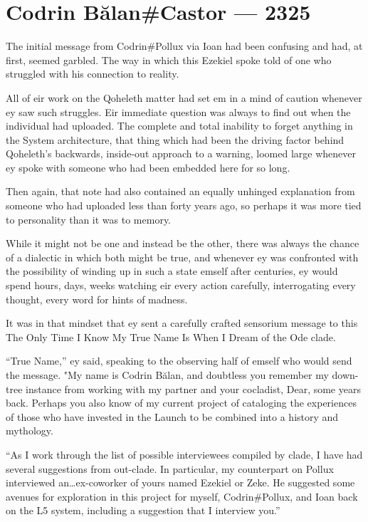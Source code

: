 \hypertarget{codrin-bux103lancastor-2325}{%
\chapter{Codrin Bălan\#Castor — 2325}\label{codrin-bux103lancastor-2325}}

The initial message from Codrin\#Pollux via Ioan had been confusing and had, at first, seemed garbled. The way in which this Ezekiel spoke told of one who struggled with his connection to reality.

All of eir work on the Qoheleth matter had set em in a mind of caution whenever ey saw such struggles. Eir immediate question was always to find out when the individual had uploaded. The complete and total inability to forget anything in the System architecture, that thing which had been the driving factor behind Qoheleth's backwards, inside-out approach to a warning, loomed large whenever ey spoke with someone who had been embedded here for so long.

Then again, that note had also contained an equally unhinged explanation from someone who had uploaded less than forty years ago, so perhaps it was more tied to personality than it was to memory.

While it might not be one and instead be the other, there was always the chance of a dialectic in which both might be true, and whenever ey was confronted with the possibility of winding up in such a state emself after centuries, ey would spend hours, days, weeks watching eir every action carefully, interrogating every thought, every word for hints of madness.

It was in that mindset that ey sent a carefully crafted sensorium message to this The Only Time I Know My True Name Is When I Dream of the Ode clade.

``True Name,'' ey said, speaking to the observing half of emself who would send the message. "My name is Codrin Bălan, and doubtless you remember my down-tree instance from working with my partner and your cocladist, Dear, some years back. Perhaps you also know of my current project of cataloging the experiences of those who have invested in the Launch to be combined into a history and mythology.

``As I work through the list of possible interviewees compiled by clade, I have had several suggestions from out-clade. In particular, my counterpart on Pollux interviewed an\ldots ex-coworker of yours named Ezekiel or Zeke. He suggested some avenues for exploration in this project for myself, Codrin\#Pollux, and Ioan back on the L5 system, including a suggestion that I interview you.''

